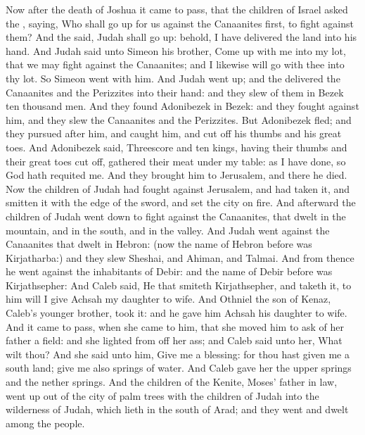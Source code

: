 
\begin{biblechapter} %
 Now after the death of Joshua it came to pass, that the children of Israel asked the \LORD, saying, Who shall go up for us against the Canaanites first, to fight against them?
\verse And the \LORD said, Judah shall go up: behold, I have delivered the land into his hand.
\verse And Judah said unto Simeon his brother, Come up with me into my lot, that we may fight against the Canaanites; and I likewise will go with thee into thy lot. So Simeon went with him.
\verse And Judah went up; and the \LORD delivered the Canaanites and the Perizzites into their hand: and they slew of them in Bezek ten thousand men.
\verse And they found Adonibezek in Bezek: and they fought against him, and they slew the Canaanites and the Perizzites.
\verse But Adonibezek fled; and they pursued after him, and caught him, and cut off his thumbs and his great toes.
\verse And Adonibezek said, Threescore and ten kings, having their thumbs and their great toes cut off, gathered their meat under my table: as I have done, so God hath requited me. And they brought him to Jerusalem, and there he died.
\verse Now the children of Judah had fought against Jerusalem, and had taken it, and smitten it with the edge of the sword, and set the city on fire.
\verse And afterward the children of Judah went down to fight against the Canaanites, that dwelt in the mountain, and in the south, and in the valley.
\verse And Judah went against the Canaanites that dwelt in Hebron: (now the name of Hebron before was Kirjatharba:) and they slew Sheshai, and Ahiman, and Talmai.
\verse And from thence he went against the inhabitants of Debir: and the name of Debir before was Kirjathsepher:
\verse And Caleb said, He that smiteth Kirjathsepher, and taketh it, to him will I give Achsah my daughter to wife.
\verse And Othniel the son of Kenaz, Caleb's younger brother, took it: and he gave him Achsah his daughter to wife.
\verse And it came to pass, when she came to him, that she moved him to ask of her father a field: and she lighted from off her ass; and Caleb said unto her, What wilt thou?
\verse And she said unto him, Give me a blessing: for thou hast given me a south land; give me also springs of water. And Caleb gave her the upper springs and the nether springs.
\verse And the children of the Kenite, Moses' father in law, went up out of the city of palm trees with the children of Judah into the wilderness of Judah, which lieth in the south of Arad; and they went and dwelt among the people.

\end{biblechapter}
